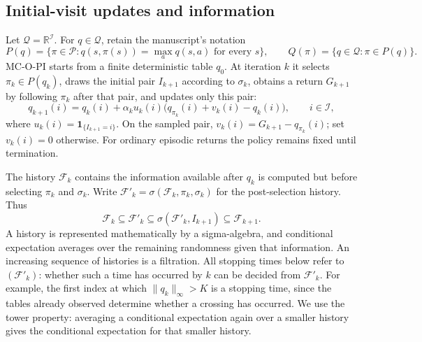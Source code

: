 \subsection{Initial-visit updates and information}
Let $\mathcal Q=\mathbb R^{\mathcal I}$. For $q\in\mathcal Q$, retain the manuscript's notation
\[
P(q)=\{\pi\in\mathcal P:q(s,\pi(s))=\max_a q(s,a)\text{ for every }s\},
\qquad Q(\pi)=\{q\in\mathcal Q:\pi\in P(q)\}.
\]
MC-O-PI starts from a finite deterministic table $q_0$. At iteration $k$ it selects $\pi_k\in P(q_k)$, draws the initial pair $I_{k+1}$ according to $\sigma_k$, obtains a return $G_{k+1}$ by following $\pi_k$ after that pair, and updates only this pair:
\begin{equation}\label{eq: update q with chi}
q_{k+1}(i)=q_k(i)+\alpha_k u_k(i)\bigl(q_{\pi_k}(i)+v_k(i)-q_k(i)\bigr),\qquad i\in\mathcal I,
\end{equation}
where $u_k(i)=\mathbf1_{\{I_{k+1}=i\}}$. On the sampled pair, $v_k(i)=G_{k+1}-q_{\pi_k}(i)$; set $v_k(i)=0$ otherwise. For ordinary episodic returns the policy remains fixed until termination.

The history $\mathcal F_k$ contains the information available after $q_k$ is computed but before selecting $\pi_k$ and $\sigma_k$. Write $\mathcal F'_k=\sigma(\mathcal F_k,\pi_k,\sigma_k)$ for the post-selection history. Thus
\[
\mathcal F_k\subseteq\mathcal F'_k\subseteq\sigma(\mathcal F'_k,I_{k+1})\subseteq\mathcal F_{k+1}.
\]
A history is represented mathematically by a sigma-algebra, and conditional expectation averages over the remaining randomness given that information. An increasing sequence of histories is a filtration. All stopping times below refer to $(\mathcal F'_k)$: whether such a time has occurred by $k$ can be decided from $\mathcal F'_k$. For example, the first index at which $\|q_k\|_\infty>K$ is a stopping time, since the tables already observed determine whether a crossing has occurred. We use the tower property: averaging a conditional expectation again over a smaller history gives the conditional expectation for that smaller history.

